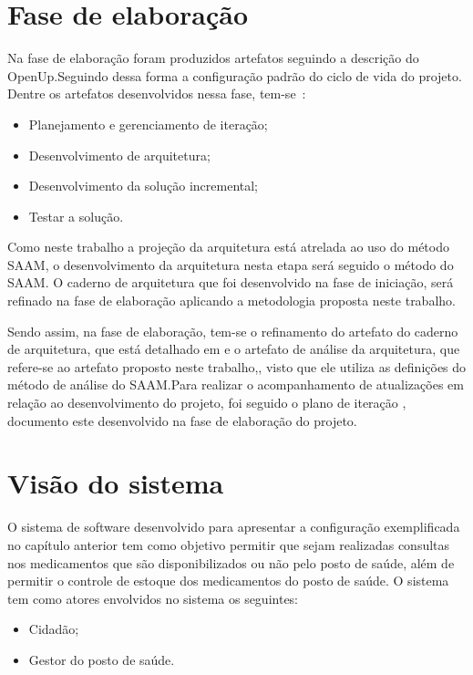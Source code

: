 \section{Fase de elaboração}
Na fase de elaboração foram produzidos artefatos seguindo a descrição do \acrfull{OpenUp}.Seguindo dessa forma a configuração padrão do ciclo de vida do projeto. Dentre os artefatos desenvolvidos nessa fase, tem-se~\cite{openup}:

\begin{itemize}
    \item Planejamento e gerenciamento de iteração;
    \item Desenvolvimento de arquitetura;
    \item Desenvolvimento da solução incremental;
    \item Testar a solução.
\end{itemize}

Como neste trabalho a projeção da arquitetura está atrelada ao uso do método \acrfull{SAAM}, o desenvolvimento da arquitetura nesta etapa será seguido o método do \acrfull{SAAM}. O caderno de arquitetura que foi desenvolvido na fase de iniciação, será refinado na fase de elaboração aplicando a metodologia proposta neste trabalho.

Sendo assim, na fase de elaboração, tem-se o refinamento do artefato do caderno de arquitetura, que está detalhado em  e o artefato de análise da arquitetura, que refere-se ao artefato proposto neste trabalho,, visto que ele utiliza as definições do método de análise do \acrfull{SAAM}.Para realizar o acompanhamento de atualizações em relação ao desenvolvimento do projeto, foi seguido o plano de iteração , documento este desenvolvido na fase de elaboração do projeto.

\section{Visão do sistema}
\label{sec:visão do sistema}
O sistema de software desenvolvido para apresentar a configuração exemplificada no capítulo anterior tem como
objetivo permitir que sejam realizadas consultas nos medicamentos que são disponibilizados ou não pelo posto de saúde, além de permitir o controle de estoque dos medicamentos do posto de saúde.
O sistema tem como atores envolvidos no sistema os seguintes:
\begin{itemize}
    \item Cidadão;
    \item Gestor do posto de saúde.
\end{itemize}

